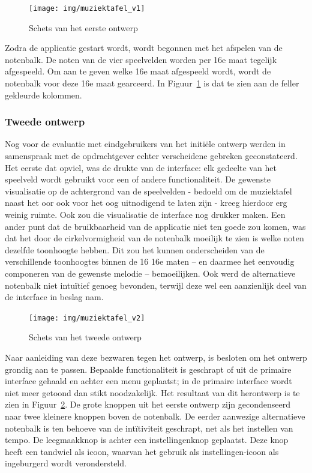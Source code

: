 \documentclass{acm}
\begin{document}
\begin{figure}
  \texttt{[image: img/muziektafel\_v1]}
  \caption{Schets van het eerste ontwerp}
  \label{fig:muziektafel_v1}
\end{figure}

Zodra de applicatie gestart wordt, wordt begonnen met het afspelen van de notenbalk. De noten van de vier speelvelden worden per 16e maat tegelijk afgespeeld. Om aan te geven welke 16e maat afgespeeld wordt, wordt de notenbalk voor deze 16e maat gearceerd. In Figuur~\ref{fig:muziektafel_v1} is dat te zien aan de feller gekleurde kolommen.

\subsubsection{Tweede ontwerp}
Nog voor de evaluatie met eindgebruikers van het initi\"ele ontwerp werden in samenspraak met de opdrachtgever echter verscheidene gebreken geconstateerd. Het eerste dat opviel, was de drukte van de interface: elk gedeelte van het speelveld wordt gebruikt voor een of andere functionaliteit. De gewenste visualisatie op de achtergrond van de speelvelden - bedoeld om de muziektafel naast het oor ook voor het oog uitnodigend te laten zijn - kreeg hierdoor erg weinig ruimte. Ook zou die visualisatie de interface nog drukker maken. Een ander punt dat de bruikbaarheid van de applicatie niet ten goede zou komen, was dat het door de cirkelvormigheid van de notenbalk moeilijk te zien is welke noten dezelfde toonhoogte hebben. Dit zou het kunnen onderscheiden van de verschillende toonhoogtes binnen de 16 16e maten -- en daarmee het eenvoudig componeren van de gewenste melodie -- bemoeilijken. Ook werd de alternatieve notenbalk niet intu\"itief genoeg bevonden, terwijl deze wel een aanzienlijk deel van de interface in beslag nam.

\begin{figure}
  \texttt{[image: img/muziektafel\_v2]}
  \caption{Schets van het tweede ontwerp}
  \label{fig:muziektafel_v2}
\end{figure}

Naar aanleiding van deze bezwaren tegen het ontwerp, is besloten om het ontwerp grondig aan te passen. Bepaalde functionaliteit is geschrapt of uit de primaire interface gehaald en achter een menu geplaatst; in de primaire interface wordt niet meer getoond dan stikt noodzakelijk. Het resultaat van dit herontwerp is te zien in Figuur~\ref{fig:muziektafel_v2}. De grote knoppen uit het eerste ontwerp zijn gecondenseerd naar twee kleinere knoppen boven de notenbalk. De eerder aanwezige alternatieve notenbalk is ten behoeve van de int\"itiviteit geschrapt, net als het instellen van tempo. De leegmaakknop is achter een instellingenknop geplaatst. Deze knop heeft een tandwiel als icoon, waarvan het gebruik als instellingen-icoon als ingeburgerd wordt verondersteld.
\end{document}
